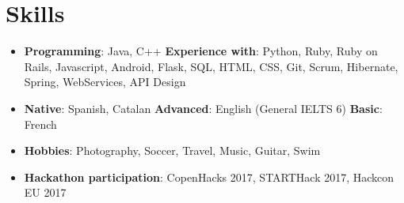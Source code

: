 \documentclass[letterpaper,11pt]{article}
\newcommand{\resumeSubHeadingListStart}{\begin{itemize}[leftmargin=*]}
\newcommand{\resumeSubHeadingListEnd}{\end{itemize}}
\begin{document}
\section{Skills}
  \resumeSubHeadingListStart
    \item{
      \textbf{Programming}{: Java, C++}
      \textbf{Experience with}{: Python, Ruby, Ruby on Rails, Javascript, Android, Flask, SQL, HTML, CSS, Git, Scrum, Hibernate, Spring, WebServices, API Design}
    }
    \item{
      \textbf{Native}{: Spanish, Catalan}
      \textbf{Advanced}{: English (General IELTS 6)}
      \textbf{Basic}{: French}
    }
    \item{
      \textbf{Hobbies}{: Photography, Soccer, Travel, Music, Guitar, Swim}
    }
    \item{
      \textbf{Hackathon participation}{: CopenHacks 2017, STARTHack 2017, Hackcon EU 2017}
    }
  \resumeSubHeadingListEnd


\end{document}
